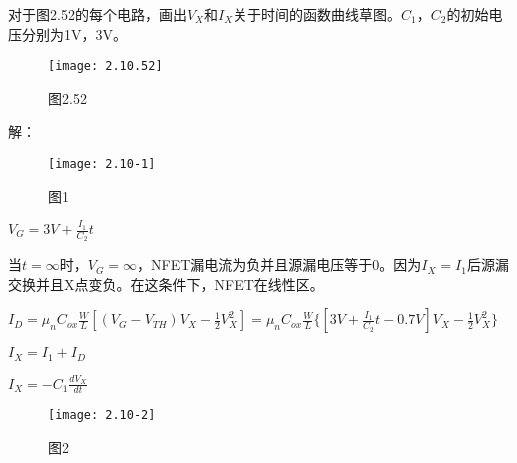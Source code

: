 


对于图2.52的每个电路，画出$V_X$和$I_X$关于时间的函数曲线草图。$C_1$，$C_2$的初始电压分别为1V，3V。

		\begin{figure}[H] %
	\begin{minipage}{\linewidth}
		\texttt{[image: 2.10.52]}
	\end{minipage}
	\caption*{图2.52} %
\end{figure}

解：

\scalebox{3}{（a）}

		\begin{figure}[H] %
	\begin{minipage}{\linewidth}
		\texttt{[image: 2.10-1]}
	\end{minipage}
	\caption*{图1} %
\end{figure}

$V_G=3V+\frac{I_1}{C_2}t$

当$t=\infty$时，$V_G=\infty$，NFET漏电流为负并且源漏电压等于0。因为$I_X=I_1$后源漏交换并且X点变负。在这条件下，NFET在线性区。

$I_D=\mu_nC_{ox}\frac{W}{L}[(V_{G}-V_{TH})V_{X}-\frac{1}{2}V_{X}^2]=\mu_nC_{ox}\frac{W}{L}\{[3V+\frac{I_1}{C_2}t-0.7V]V_{X}-\frac{1}{2}V_{X}^2\}$

$I_X=I_1+I_D$

$I_X=-C_1\frac{dV_X}{dt}$

		\begin{figure}[H] %
	\begin{minipage}{\linewidth}
		\texttt{[image: 2.10-2]}
	\end{minipage}
	\caption*{图2} %
\end{figure}

